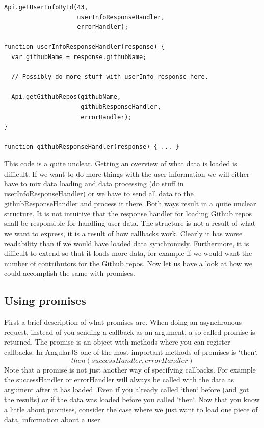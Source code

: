 \documentclass[a4paper,12pt]{article}
\begin{document}
\begin{lstlisting}[caption={Code, using callbacks, showing how we can load two pieces of data, where the second is dependent on the first}, frame=single]
Api.getUserInfoById(43, 
                    userInfoResponseHandler, 
                    errorHandler);

function userInfoResponseHandler(response) {
  var githubName = response.githubName;

  // Possibly do more stuff with userInfo response here.

  Api.getGithubRepos(githubName, 
                     githubResponseHandler, 
                     errorHandler);
}

function githubResponseHandler(response) { ... }
\end{lstlisting}
This code is a quite unclear. Getting an overview of what data is loaded is difficult. If we want to do more things with the user information we will either have to mix data loading and data processing (do stuff in userInfoResponseHandler) or we
have to send all data to the githubResponseHandler and process it there. Both ways result in a quite unclear structure. It is not intuitive that the response handler for loading Github repos shall be responsible for handling user data. The structure is not a result of what we want to express, it is a result of how callbacks work. 
Clearly it has worse readability than if we would have loaded data synchronusly.
Furthermore, it is difficult to extend so that it loads more data, for example if we would want the number of contributors for the Github repos. Now let us have a look at how we could accomplish the same with promises.

\subsection{Using promises}
First a brief description of what promises are. When doing an asynchronous request, instead of you sending a callback as an argument, a so called promise is returned. The promise is an object with methods where you can register callbacks.
In AngularJS one of the most important methods of promises is `then`.
\[ then(successHandler, errorHandler) \]
Note that a promise is not just another way of specifying callbacks. For example the successHandler or errorHandler will always be called with the data as argument after it has loaded.
Even if you already called `then` before (and got the results) or if the data was loaded before you called `then`.
Now that you know a little about promises, consider the case where we just want to load one piece of data, information about a user.
\end{document}
